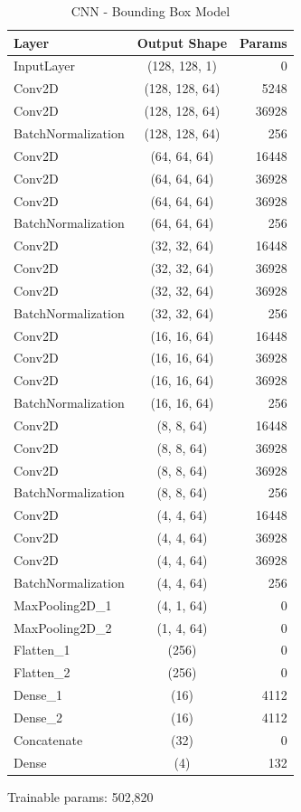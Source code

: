 \documentclass[paper=a4, fontsize=11pt]{scrartcl}
\numberwithin{equation}{section}		%
\numberwithin{table}{section}				%
\begin{document}
\begin{table}[h!]
  \begin{center}
    \caption{CNN - Bounding Box Model}
    \label{tab:table1}
    \begin{tabular}{l|c|r} %
      \textbf{Layer} & \textbf{Output Shape} & \textbf{Params}\\
      \hline
      InputLayer & (128, 128, 1) & 0\\
      Conv2D & (128, 128, 64) & 5248\\
      Conv2D & (128, 128, 64) & 36928\\
      BatchNormalization & (128, 128, 64) & 256\\
      Conv2D & (64, 64, 64) & 16448\\
      Conv2D & (64, 64, 64) & 36928\\
      Conv2D & (64, 64, 64) & 36928\\
      BatchNormalization & (64, 64, 64) & 256\\
      Conv2D & (32, 32, 64) & 16448\\
      Conv2D & (32, 32, 64) & 36928\\
      Conv2D & (32, 32, 64) & 36928\\
      BatchNormalization & (32, 32, 64) & 256\\
      Conv2D & (16, 16, 64) & 16448\\
      Conv2D & (16, 16, 64) & 36928\\
      Conv2D & (16, 16, 64) & 36928\\
      BatchNormalization & (16, 16, 64) & 256\\
      Conv2D & (8, 8, 64) & 16448\\
      Conv2D & (8, 8, 64) & 36928\\
      Conv2D & (8, 8, 64) & 36928\\
      BatchNormalization & (8, 8, 64) & 256\\
      Conv2D & (4, 4, 64) & 16448\\
      Conv2D & (4, 4, 64) & 36928\\
      Conv2D & (4, 4, 64) & 36928\\
      BatchNormalization & (4, 4, 64) & 256\\
      MaxPooling2D_1 & (4, 1, 64) & 0\\
      MaxPooling2D_2 & (1, 4, 64) & 0\\
      Flatten_1 & (256) & 0\\
      Flatten_2 & (256) & 0\\
      Dense_1 & (16) & 4112\\
      Dense_2 & (16) & 4112\\
      Concatenate & (32) & 0\\
      Dense & (4) & 132\\
    \end{tabular}
    \begin{tablenotes}
      \small
      \item Trainable params: 502,820
    \end{tablenotes}
  \end{center}
\end{table}
\end{document}
